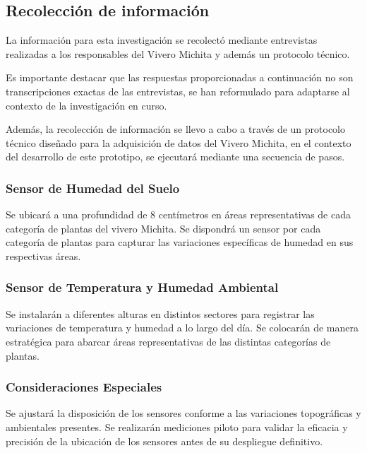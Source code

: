 \subsection{Recolección de información}
La información para esta investigación se recolectó mediante entrevistas realizadas a los responsables del Vivero Michita y además un protocolo técnico.

\bigbreak
Es importante destacar que las respuestas proporcionadas a continuación no son
transcripciones exactas de las entrevistas, se han reformulado para adaptarse al
contexto de la investigación en curso.
\newpage


Además, la recolección de información se llevo a cabo a través de un protocolo técnico diseñado para la adquisición de datos del Vivero Michita, en el contexto del desarrollo de este prototipo, se ejecutará mediante una secuencia de pasos.

\subsubsection*{Sensor de Humedad del Suelo}
Se ubicará a una profundidad de 8 centímetros en áreas representativas de cada categoría de plantas del vivero Michita. Se dispondrá un sensor por cada categoría de plantas para capturar las variaciones específicas de humedad en sus respectivas áreas.

\subsubsection*{Sensor de Temperatura y Humedad Ambiental}
Se instalarán a diferentes alturas en distintos sectores para registrar las variaciones de temperatura y humedad a lo largo del día. Se colocarán de manera estratégica para abarcar áreas representativas de las distintas categorías de plantas.

\subsubsection*{Consideraciones Especiales}
Se ajustará la disposición de los sensores conforme a las variaciones topográficas y ambientales presentes. Se realizarán mediciones piloto para validar la eficacia y precisión de la ubicación de los sensores antes de su despliegue definitivo.